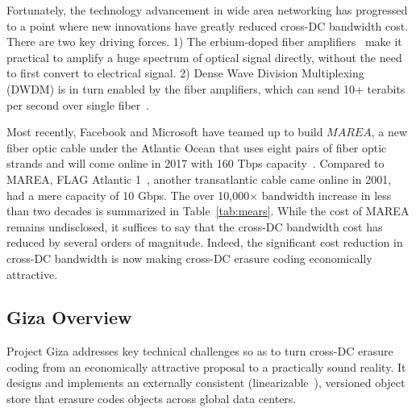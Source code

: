 Fortunately, the technology advancement in wide area networking has progressed to a point where new innovations have greatly reduced cross-DC bandwidth cost. There are two key driving forces. 1) The erbium-doped fiber amplifiers~\cite{mears1986low} make it practical to amplify a huge spectrum of optical signal directly, without the need to first convert to electrical signal. 2) Dense Wave Division Multiplexing (DWDM) is in turn enabled by the fiber amplifiers, which can send 10+ terabits per second over single fiber~\cite{zhu2011112}.

Most recently, Facebook and Microsoft have teamed up to build $MAREA$, a new fiber optic cable under the Atlantic Ocean that uses eight pairs of fiber optic strands and will come online in 2017 with 160 Tbps capacity~\cite{bib:MAREA1, bib:MAREA2}. Compared to MAREA, FLAG Atlantic 1~\cite{bib:FA-1}, another transatlantic cable came online in 2001, had a mere capacity of 10 Gbps. The over 10,000$\times$ bandwidth increase in less than two decades is summarized in Table~\ref{tab:mears}. While the cost of MAREA remains undisclosed, it suffices to say that the cross-DC bandwidth cost has reduced by several orders of magnitude. Indeed, the significant cost reduction in cross-DC bandwidth is now making cross-DC erasure coding economically attractive.


\subsection{Giza Overview}

Project Giza addresses key technical challenges so as to turn cross-DC erasure coding from an economically attractive proposal to a practically sound reality.
It designs and implements an externally consistent (linearizable~\cite{herlihy1990linearizability}), versioned object store that erasure codes objects across global data centers.

